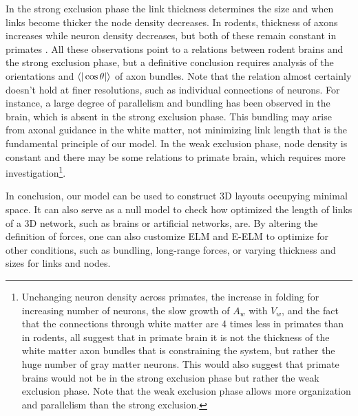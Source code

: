 \documentclass[nofootinbib,preprint,floatfix]{revtex4} %
\begin{document}
In the strong exclusion phase the link thickness determines the size and when links become thicker the node density decreases. 
In rodents, thickness of axons increases while neuron density decreases, but both of these remain constant in primates \cite{herculano2012remarkable}. All these observations point to a relations between rodent brains and the strong exclusion phase, but a definitive conclusion requires analysis of the orientations and $\be{|\cos\theta|}$ of axon bundles.%
Note that the relation almost certainly doesn't hold at finer resolutions, such as individual connections of neurons. 
For instance, a large degree of parallelism and bundling has been observed in the brain\cite{le2001diffusion,assaf2008diffusion}, which is absent in the strong exclusion phase. This bundling may arise from axonal guidance in the white matter, not minimizing link length that is the fundamental principle of our model.
In the weak exclusion phase, node density is constant and there may be some relations to primate brain, which requires more investigation\footnote{
Unchanging neuron density across primates, the increase in folding for increasing number of neurons, the slow growth of $A_w$ with $V_w$, and the fact that the connections through white matter are 4 times less in primates than in rodents\cite{herculano2012remarkable}, all suggest that in primate brain it is not the thickness of the white matter axon bundles that is constraining the system, but rather the huge number of gray matter neurons. 
This would also suggest that primate brains would not be in the strong exclusion phase but rather the weak exclusion phase. Note that the weak exclusion phase allows more organization and parallelism than the strong exclusion.}.


In conclusion, our model can be used to construct 3D layouts occupying minimal space. It can also serve  as a null model to check how optimized the length of links of a 3D network, such as brains or artificial networks, are. By altering the definition  of forces, one can also customize ELM and E-ELM to optimize for other conditions, such as bundling, long-range forces, or varying thickness and sizes for links and nodes. 



\newpage
\newpage



\end{document}
